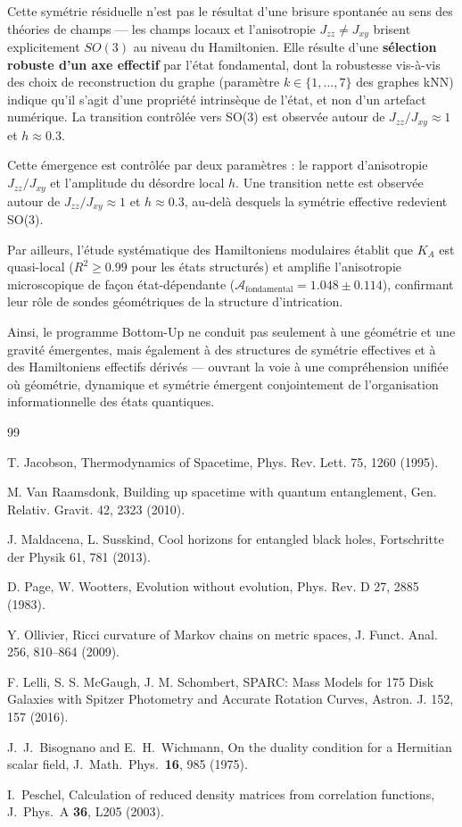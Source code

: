 \documentclass[11pt]{article}
\begin{document}
Cette symétrie résiduelle n'est pas le résultat d'une brisure spontanée au sens des théories de champs --- les champs locaux et l'anisotropie $J_{zz} \neq J_{xy}$ brisent explicitement $SO(3)$ au niveau du Hamiltonien. Elle résulte d'une \textbf{sélection robuste d'un axe effectif} par l'état fondamental, dont la robustesse vis-à-vis des choix de reconstruction du graphe (paramètre $k \in \{1,\ldots,7\}$ des graphes kNN) indique qu'il s'agit d'une propriété intrinsèque de l'état, et non d'un artefact numérique. La transition contrôlée vers SO(3) est observée autour de $J_{zz}/J_{xy} \approx 1$ et $h \approx 0.3$.

Cette émergence est contrôlée par deux paramètres : le rapport d'anisotropie $J_{zz}/J_{xy}$ et l'amplitude du désordre local $h$. Une transition nette est observée autour de $J_{zz}/J_{xy} \approx 1$ et $h \approx 0.3$, au-delà desquels la symétrie effective redevient SO(3).

Par ailleurs, l'étude systématique des Hamiltoniens modulaires établit que $K_A$ est quasi-local ($R^2 \geq 0.99$ pour les états structurés) et amplifie l'anisotropie microscopique de façon état-dépendante ($\mathcal{A}_{\mathrm{fondamental}} = 1.048 \pm 0.114$), confirmant leur rôle de sondes géométriques de la structure d'intrication.

Ainsi, le programme Bottom-Up ne conduit pas seulement à une géométrie et une gravité émergentes, mais également à des structures de symétrie effectives et à des Hamiltoniens effectifs dérivés --- ouvrant la voie à une compréhension unifiée où géométrie, dynamique et symétrie émergent conjointement de l'organisation informationnelle des états quantiques.

\begin{thebibliography}{99}

T. Jacobson,
Thermodynamics of Spacetime,
Phys. Rev. Lett. 75, 1260 (1995).

M. Van Raamsdonk,
Building up spacetime with quantum entanglement,
Gen. Relativ. Gravit. 42, 2323 (2010).

J. Maldacena, L. Susskind,
Cool horizons for entangled black holes,
Fortschritte der Physik 61, 781 (2013).

D. Page, W. Wootters,
Evolution without evolution,
Phys. Rev. D 27, 2885 (1983).

Y. Ollivier,
Ricci curvature of Markov chains on metric spaces,
J. Funct. Anal. 256, 810--864 (2009).

F. Lelli, S. S. McGaugh, J. M. Schombert,
SPARC: Mass Models for 175 Disk Galaxies with Spitzer Photometry and Accurate Rotation Curves,
Astron. J. 152, 157 (2016).

J.~J.~Bisognano and E.~H.~Wichmann,
On the duality condition for a Hermitian scalar field,
J.~Math.~Phys.\ \textbf{16}, 985 (1975).

I.~Peschel,
Calculation of reduced density matrices from correlation functions,
J.~Phys.~A \textbf{36}, L205 (2003).

\end{thebibliography}
\end{document}
